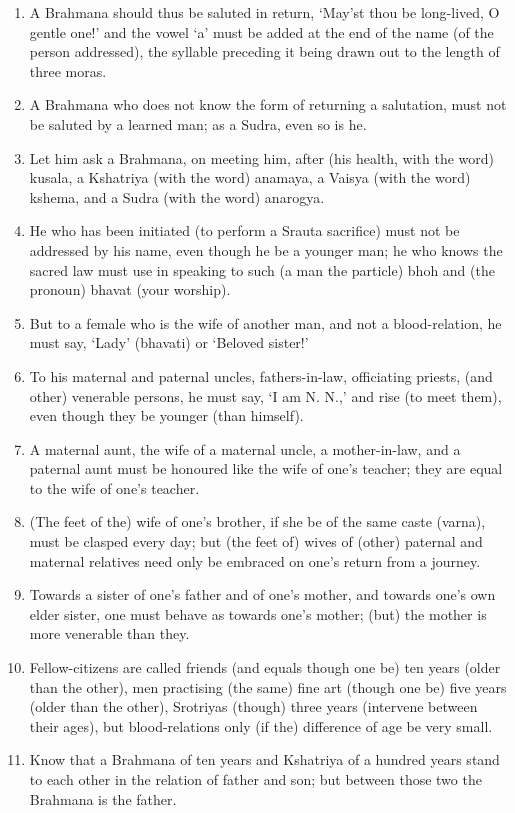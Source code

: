 \begin{enumerate}
\item A Brahmana should thus be saluted in return, `May'st thou be long-lived, O gentle one!' and the vowel `a' must be added at the end of the name (of the person addressed), the syllable preceding it being drawn out to the length of three moras.
\item A Brahmana who does not know the form of returning a salutation, must not be saluted by a learned man; as a Sudra, even so is he.
\item Let him ask a Brahmana, on meeting him, after (his health, with the word) kusala, a Kshatriya (with the word) anamaya, a Vaisya (with the word) kshema, and a Sudra (with the word) anarogya.
\item He who has been initiated (to perform a Srauta sacrifice) must not be addressed by his name, even though he be a younger man; he who knows the sacred law must use in speaking to such (a man the particle) bhoh and (the pronoun) bhavat (your worship).
\item But to a female who is the wife of another man, and not a blood-relation, he must say, `Lady' (bhavati) or `Beloved sister!'
\item To his maternal and paternal uncles, fathers-in-law, officiating priests, (and other) venerable persons, he must say, `I am N. N.,' and rise (to meet them), even though they be younger (than himself).
\item A maternal aunt, the wife of a maternal uncle, a mother-in-law, and a paternal aunt must be honoured like the wife of one's teacher; they are equal to the wife of one's teacher.
\item (The feet of the) wife of one's brother, if she be of the same caste (varna), must be clasped every day; but (the feet of) wives of (other) paternal and maternal relatives need only be embraced on one's return from a journey.
\item Towards a sister of one's father and of one's mother, and towards one's own elder sister, one must behave as towards one's mother; (but) the mother is more venerable than they.
\item Fellow-citizens are called friends (and equals though one be) ten years (older than the other), men practising (the same) fine art (though one be) five years (older than the other), Srotriyas (though) three years (intervene between their ages), but blood-relations only (if the) difference of age be very small.
\item Know that a Brahmana of ten years and Kshatriya of a hundred years stand to each other in the relation of father and son; but between those two the Brahmana is the father.

\end{enumerate}
